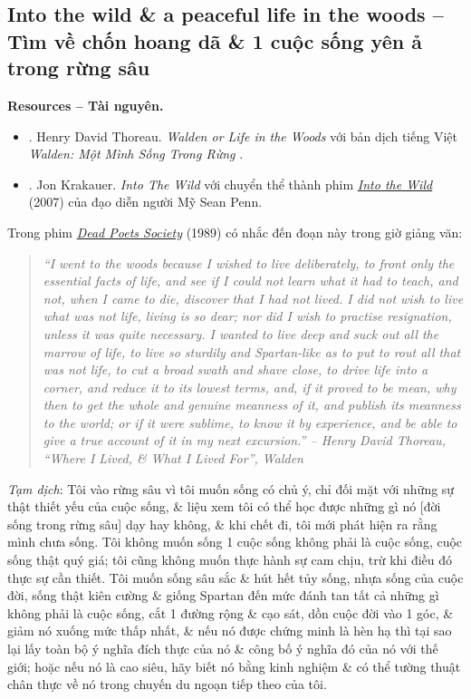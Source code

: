 \documentclass[12pt]{article}
\begin{document}
\subsection{Into the wild \& a peaceful life in the woods -- Tìm về chốn hoang dã \& 1 cuộc sống yên ả trong rừng sâu}
\textbf{\textsf{Resources -- Tài nguyên.}}
\begin{itemize}
	\item \cite{Thoreau2014}. Henry David Thoreau. {\it Walden or Life in the Woods} với bản dịch tiếng Việt {\it Walden: Một Mình Sống Trong Rừng} \cite{Thoreau2023}.
	\item \cite{Krakauer1997}. Jon Krakauer. {\it Into The Wild} với chuyển thể thành phim \href{https://www.imdb.com/title/tt0758758}{\it Into the Wild} (2007) của đạo diễn người Mỹ {\sc Sean Penn}.
\end{itemize}
Trong phim \href{https://www.imdb.com/title/tt0097165}{\it Dead Poets Society} (1989) có nhắc đến đoạn này trong giờ giảng văn:
\begin{quote}\it
	``I went to the woods because I wished to live deliberately, to front only the essential facts of life, and see if I could not learn what it had to teach, and not, when I came to die, discover that I had not lived. I did not wish to live what was not life, living is so dear; nor did I wish to practise resignation, unless it was quite necessary. I wanted to live deep and suck out all the marrow of life, to live so sturdily and Spartan-like as to put to rout all that was not life, to cut a broad swath and shave close, to drive life into a corner, and reduce it to its lowest terms, and, if it proved to be mean, why then to get the whole and genuine meanness of it, and publish its meanness to the world; or if it were sublime, to know it by experience, and be able to give a true account of it in my next excursion.'' -- {\sc Henry David Thoreau}, ``Where I Lived, \& What I Lived For'', Walden {\rm\cite{Thoreau2014}}
\end{quote}
{\it Tạm dịch}: Tôi vào rừng sâu vì tôi muốn sống có chủ ý, chỉ đối mặt với những sự thật thiết yếu của cuộc sống, \& liệu xem tôi có thể học được những gì nó [đời sống trong rừng sâu] dạy hay không, \& khi chết đi, tôi mới phát hiện ra rằng mình chưa sống. Tôi không muốn sống 1 cuộc sống không phải là cuộc sống, cuộc sống thật quý giá; tôi cũng không muốn thực hành sự cam chịu, trừ khi điều đó thực sự cần thiết. Tôi muốn sống sâu sắc \& hút hết tủy sống, nhựa sống của cuộc đời, sống thật kiên cường \& giống Spartan đến mức đánh tan tất cả những gì không phải là cuộc sống, cắt 1 đường rộng \& cạo sát, dồn cuộc đời vào 1 góc, \& giảm nó xuống mức thấp nhất, \& nếu nó được chứng minh là hèn hạ thì tại sao lại lấy toàn bộ ý nghĩa đích thực của nó \& công bố ý nghĩa đó của nó với thế giới; hoặc nếu nó là cao siêu, hãy biết nó bằng kinh nghiệm \& có thể tường thuật chân thực về nó trong chuyến du ngoạn tiếp theo của tôi.
\end{document}
